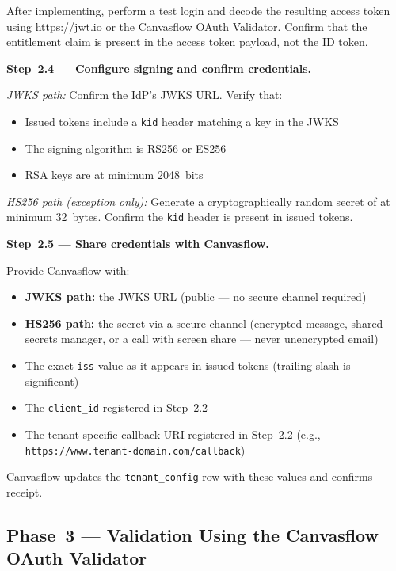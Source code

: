After implementing, perform a test login and decode the resulting access token using
\url{https://jwt.io} or the Canvasflow OAuth Validator. Confirm that the entitlement
claim is present in the access token payload, not the ID token.

\textbf{Step~2.4 --- Configure signing and confirm credentials.}

\textit{JWKS path:} Confirm the IdP's JWKS URL. Verify that:
\begin{itemize}
  \item Issued tokens include a \texttt{kid} header matching a key in the JWKS
  \item The signing algorithm is RS256 or ES256
  \item RSA keys are at minimum 2048~bits
\end{itemize}

\textit{HS256 path (exception only):} Generate a cryptographically random secret of at
minimum 32~bytes. Confirm the \texttt{kid} header is present in issued tokens.

\textbf{Step~2.5 --- Share credentials with Canvasflow.}

Provide Canvasflow with:
\begin{itemize}
  \item \textbf{JWKS path:} the JWKS URL (public --- no secure channel required)
  \item \textbf{HS256 path:} the secret via a secure channel (encrypted message, shared
    secrets manager, or a call with screen share --- never unencrypted email)
  \item The exact \texttt{iss} value as it appears in issued tokens (trailing slash is
    significant)
  \item The \texttt{client\_id} registered in Step~2.2
  \item The tenant-specific callback URI registered in Step~2.2
    (e.g., \linebreak \texttt{https://www.tenant-domain.com/callback})
\end{itemize}

Canvasflow updates the \texttt{tenant\_config} row with these values and confirms
receipt.

\pagebreak

\subsection{Phase~3 --- Validation Using the Canvasflow OAuth Validator}

